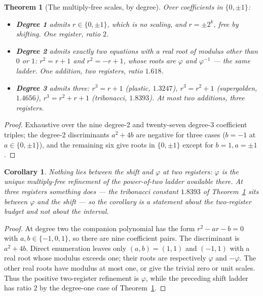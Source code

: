 \documentclass[11pt]{article}
\newtheorem{theorem}{Theorem}
\newtheorem{corollary}{Corollary}
\theoremstyle{definition}
\begin{document}
\begin{theorem}[The multiply-free scales, by degree]\label{thm:hierarchy}
Over coefficients in $\{0,\pm1\}$:
\begin{itemize}
\item \textbf{Degree 1} admits $r\in\{0,\pm1\}$, which is no scaling, and
      $r=\pm2^k$, free by shifting. One register, ratio $2$.
\item \textbf{Degree 2} admits exactly two equations with a real root of modulus
      other than $0$ or $1$: $r^2=r+1$ and $r^2=-r+1$, whose roots are $\varphi$
      and $\varphi^{-1}$ --- the same ladder. One addition, two registers,
      ratio $1.618$.
\item \textbf{Degree 3} admits three: $r^3=r+1$ (plastic, $1.3247$),
      $r^3=r^2+1$ (supergolden, $1.4656$), $r^3=r^2+r+1$ (tribonacci,
      $1.8393$). At most two additions, three registers.
\end{itemize}
\end{theorem}
\begin{proof}
Exhaustive over the nine degree-2 and twenty-seven degree-3 coefficient triples;
the degree-2 discriminants $a^2+4b$ are negative for three cases
($b=-1$ at $a\in\{0,\pm1\}$), and the remaining six give roots in $\{0,\pm1\}$
except for $b=1,a=\pm1$.
\end{proof}

\begin{corollary}\label{cor:nothing-between}
Nothing lies between the shift and $\varphi$ \emph{at two registers}: $\varphi$
is the unique multiply-free refinement of the power-of-two ladder available
there. At three registers something does --- the tribonacci constant $1.8393$ of
Theorem~\ref{thm:hierarchy} sits between $\varphi$ and the shift --- so the
corollary is a statement about the two-register budget and not about the
interval.
\end{corollary}
\begin{proof}
At degree two the companion polynomial has the form
$r^2-ar-b=0$ with $a,b\in\{-1,0,1\}$, so there are nine coefficient pairs.
The discriminant is $a^2+4b$.  Direct enumeration leaves only
$(a,b)=(1,1)$ and $(-1,1)$ with a real root whose modulus exceeds one;
their roots are respectively $\varphi$ and $-\varphi$.  The other real
roots have modulus at most one, or give the trivial zero or unit scales.
Thus the positive two-register refinement is $\varphi$, while the preceding
shift ladder has ratio $2$ by the degree-one case of
Theorem~\ref{thm:hierarchy}.
\end{proof}
\end{document}
